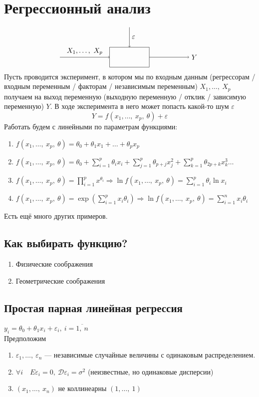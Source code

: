\documentclass[12pt, a4paper]{article}
\newcommand{\dev}{\mathcal{D}}
\begin{document}
\section*{Регрессионный анализ}
\[
\begin{tikzpicture}
    \draw[->] (-3.5, 0) -- node[anchor=south]{$X_1,\dots,\ X_p$} ++(2.5, 0);
    \draw (-1, -0.5) rectangle ++(2, 1);
    \draw[->] (1, 0) -- ++(2, 0) node[anchor=west]{$Y$};
    \draw[->] (0, 1.5) -- node[anchor=west]{$\varepsilon$} (0, 0.5);
\end{tikzpicture}
\]
Пусть проводится эксперимент, в котором мы по входным данным (регрессорам / входным переменным / факторам / независимым переменным) $X_1,\dots,\ X_p$ получаем на выход переменную (выходную переменную / отклик / зависимую переменную) $Y$. В ходе эксперимента в него может попасть какой-то шум $\varepsilon$
\[Y = f(x_1,\dots,\ x_p,\ \theta) + \varepsilon\]
Работать будем с линейными по параметрам функциями:
\begin{enumerate}
    \item $f(x_1,\dots,\ x_p,\ \theta) = \displaystyle \theta_0 + \theta_1 x_1 + \dots + \theta_p x_p$
    \item $f(x_1,\dots,\ x_p,\ \theta) = \displaystyle \theta_0 + \sum_{i = 1}^{p} \theta_i x_i + \sum_{j = 1}^{p} \theta_{p + j} x_j^2 + \sum_{k = 1}^{p} \theta_{2p + k} x_k^3 \dots$
    \item $f(x_1,\dots,\ x_p,\ \theta) = \displaystyle\prod_{i = 1}^{p} x^{\theta_i} \Rightarrow \ln f(x_1,\dots,\ x_p,\ \theta) = \sum_{i = 1}^{p} \theta_i \ln x_i$
    \item $f(x_1,\dots,\ x_p,\ \theta) = \displaystyle \exp\left( \sum\limits_{i = 1}^{p} x_i \theta_i \right) \Rightarrow \ln f(x_1,\dots,\ x_p,\ \theta) = \sum_{i = 1}^{n} x_i \theta_i$
\end{enumerate}
Есть ещё много других примеров.
\subsection*{Как выбирать функцию?}
\begin{enumerate}
    \item Физические соображения
    \item Геометрические соображения
\end{enumerate}
\subsection*{Простая парная линейная регрессия}
$y_i = \theta_0 + \theta_1 x_i + \varepsilon_i,\ i = \overline{1,\ n}$\\
Предположим
\begin{enumerate}
    \item $\varepsilon_1,\dots,\ \varepsilon_n$ --- независимые случайные величины с одинаковым распределением.
    \item $\forall i\quad E\varepsilon_i = 0,\ \dev \varepsilon_i = \sigma^2$ (неизвестные, но одинаковые дисперсии)
    \item $(x_1,\dots,\ x_n)$ не коллинеарны $(1,\dots,\ 1)$
\end{enumerate}
\end{document}
